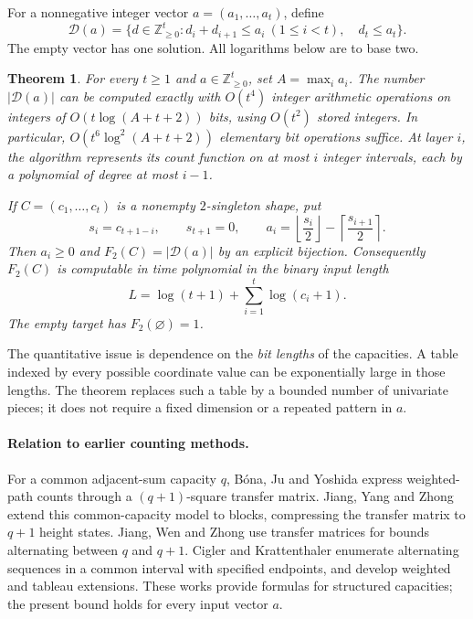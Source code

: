 \documentclass[11pt]{article}
\newtheorem{theorem}{Theorem}
\theoremstyle{remark}
\newcommand{\Z}{\mathbb Z}
\newcommand{\card}[1]{\lvert #1\rvert}
\begin{document}
For a nonnegative integer vector $a=(a_1,\ldots,a_t)$, define
\begin{equation}\label{eq:polytope}
 \mathcal D(a)=\{d\in\Z_{\geq0}^t:
 d_i+d_{i+1}\leq a_i\ (1\leq i<t),\quad d_t\leq a_t\}.
\end{equation}
The empty vector has one solution. All logarithms below are to base two.

\begin{theorem}\label{thm:main}
For every $t\geq1$ and $a\in\Z_{\geq0}^t$, set $A=\max_i a_i$.
The number $\card{\mathcal D(a)}$ can be computed exactly with
$O(t^4)$ integer arithmetic operations on integers of
$O(t\log(A+t+2))$ bits, using $O(t^2)$ stored integers.
In particular, $O(t^6\log^2(A+t+2))$ elementary bit operations suffice.
At layer $i$, the algorithm represents its count function on at most
$i$ integer intervals, each by a polynomial of degree at most $i-1$.

If $C=(c_1,\ldots,c_t)$ is a nonempty $2$-singleton shape, put
\begin{equation}\label{eq:capacity}
 s_i=c_{t+1-i},\qquad s_{t+1}=0,\qquad
 a_i=\left\lfloor \frac{s_i}{2}\right\rfloor-\left\lceil \frac{s_{i+1}}{2}\right\rceil.
\end{equation}
Then $a_i\geq0$ and $F_2(C)=\card{\mathcal D(a)}$ by an explicit
bijection. Consequently $F_2(C)$ is computable in time polynomial in
the binary input length
\[
 L=\log(t+1)+\sum_{i=1}^t\log(c_i+1).
\]
The empty target has $F_2(\varnothing)=1$.
\end{theorem}

The quantitative issue is dependence on the \emph{bit lengths} of the
capacities. A table indexed by every possible coordinate value can be
exponentially large in those lengths. The theorem replaces such a table
by a bounded number of univariate pieces; it does not require a fixed
dimension or a repeated pattern in $a$.

\paragraph{Relation to earlier counting methods.}
For a common adjacent-sum capacity $q$, B\'ona, Ju and Yoshida
\cite[Section~2.1]{BJY2007} express weighted-path counts through a
$(q+1)$-square transfer matrix. Jiang, Yang and Zhong
\cite[Theorem~1.1 and equation~(4)]{JYZ2026} extend this common-capacity
model to blocks, compressing the transfer matrix to $q+1$ height states.
Jiang, Wen and Zhong
\cite[Section~2.1]{JWZ2026} use transfer matrices for bounds alternating
between $q$ and $q+1$. Cigler and Krattenthaler
\cite[Section~3, Theorem~4]{CK2024} enumerate alternating sequences in
a common interval with specified endpoints, and develop weighted and
tableau extensions. These works provide formulas for structured
capacities; the present bound holds for every input vector $a$.
\end{document}
